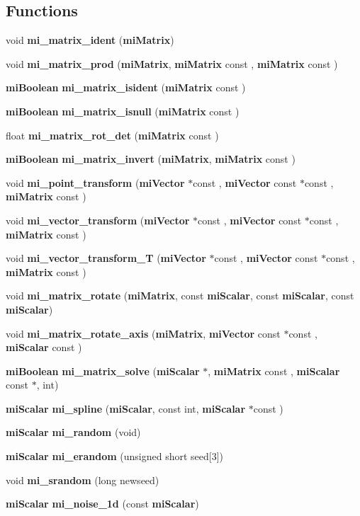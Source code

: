 \subsection*{Functions}
\begin{CompactItemize}
\item 
void {\bf mi\_\-matrix\_\-ident} ({\bf mi\-Matrix})
\item 
void {\bf mi\_\-matrix\_\-prod} ({\bf mi\-Matrix}, {\bf mi\-Matrix} const , {\bf mi\-Matrix} const )
\item 
{\bf mi\-Boolean} {\bf mi\_\-matrix\_\-isident} ({\bf mi\-Matrix} const )
\item 
{\bf mi\-Boolean} {\bf mi\_\-matrix\_\-isnull} ({\bf mi\-Matrix} const )
\item 
float {\bf mi\_\-matrix\_\-rot\_\-det} ({\bf mi\-Matrix} const )
\item 
{\bf mi\-Boolean} {\bf mi\_\-matrix\_\-invert} ({\bf mi\-Matrix}, {\bf mi\-Matrix} const )
\item 
void {\bf mi\_\-point\_\-transform} ({\bf mi\-Vector} $\ast$const , {\bf mi\-Vector} const $\ast$const , {\bf mi\-Matrix} const )
\item 
void {\bf mi\_\-vector\_\-transform} ({\bf mi\-Vector} $\ast$const , {\bf mi\-Vector} const $\ast$const , {\bf mi\-Matrix} const )
\item 
void {\bf mi\_\-vector\_\-transform\_\-T} ({\bf mi\-Vector} $\ast$const , {\bf mi\-Vector} const $\ast$const , {\bf mi\-Matrix} const )
\item 
void {\bf mi\_\-matrix\_\-rotate} ({\bf mi\-Matrix}, const {\bf mi\-Scalar}, const {\bf mi\-Scalar}, const {\bf mi\-Scalar})
\item 
void {\bf mi\_\-matrix\_\-rotate\_\-axis} ({\bf mi\-Matrix}, {\bf mi\-Vector} const $\ast$const , {\bf mi\-Scalar} const )
\item 
{\bf mi\-Boolean} {\bf mi\_\-matrix\_\-solve} ({\bf mi\-Scalar} $\ast$, {\bf mi\-Matrix} const , {\bf mi\-Scalar} const $\ast$, int)
\item 
{\bf mi\-Scalar} {\bf mi\_\-spline} ({\bf mi\-Scalar}, const int, {\bf mi\-Scalar} $\ast$const )
\item 
{\bf mi\-Scalar} {\bf mi\_\-random} (void)
\item 
{\bf mi\-Scalar} {\bf mi\_\-erandom} (unsigned short seed[3])
\item 
void {\bf mi\_\-srandom} (long newseed)
\item 
{\bf mi\-Scalar} {\bf mi\_\-noise\_\-1d} (const {\bf mi\-Scalar})
\item 

\end{CompactItemize}
